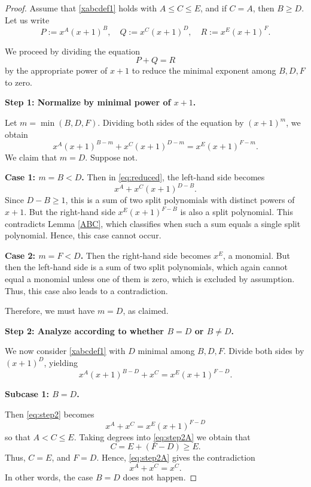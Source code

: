 \documentclass[12pt, reqno]{article}
\theoremstyle{plain}
\theoremstyle{definition}
\theoremstyle{remark}
\begin{document}
\begin{proof}
Assume that \eqref{xabcdef1} holds with \( A \leq C \leq E \), and if \( C = A \), then \( B \geq D \). Let us write
\[
P := x^A(x+1)^B, \quad Q := x^C(x+1)^D, \quad R := x^E(x+1)^F.
\]

We proceed by dividing the equation
\[
P + Q = R
\]
by the appropriate power of \( x+1 \) to reduce the minimal exponent among \( B, D, F \) to zero.

\textbf{Step 1: Normalize by minimal power of \( x+1 \).}

Let \( m = \min(B, D, F) \). Dividing both sides of the equation by \( (x+1)^m \), we obtain
\begin{equation}
\label{eq:reduced}
x^A(x+1)^{B - m} + x^C(x+1)^{D - m} = x^E(x+1)^{F - m}.
\end{equation}
We claim that \( m = D \). Suppose not.

\textbf{Case 1: \( m = B < D \).} Then in \eqref{eq:reduced}, the left-hand side becomes
\[
x^A + x^C(x+1)^{D - B}.
\]
Since \( D - B \geq 1 \), this is a sum of two split polynomials with distinct powers of \( x+1 \). But the right-hand side \( x^E(x+1)^{F - B} \) is also a split polynomial. This contradicts Lemma \ref{ABC}, which classifies when such a sum equals a single split polynomial. Hence, this case cannot occur.

\textbf{Case 2: \( m = F < D \).} Then the right-hand side becomes \( x^E \), a monomial. But then the left-hand side is a sum of two split polynomials, which again cannot equal a monomial unless one of them is zero, which is excluded by assumption. Thus, this case also leads to a contradiction.

Therefore, we must have \( m = D \), as claimed.

\textbf{Step 2: Analyze according to whether \( B = D \) or \( B \neq D \).}

We now consider \eqref{xabcdef1}
with \( D \) minimal among \( B, D, F \). Divide both sides by \( (x+1)^D \), yielding
\begin{equation}
\label{eq:step2}
x^A(x+1)^{B - D} + x^C = x^E(x+1)^{F - D}.
\end{equation}

\textbf{Subcase 1: \( B = D \).}

Then \eqref{eq:step2} becomes
\begin{equation}
\label{eq:step2A}
x^A + x^C = x^E(x+1)^{F - D}
\end{equation}
so that $A < C \leq E$. Taking degrees into  \eqref{eq:step2A} we obtain that
\[
C = E + (F - D) \geq E.
\]
Thus, $C=E$, and $F=D$. Hence, \eqref{eq:step2A} gives the contradiction 
\[
x^A+x^C = x^C.
\]
In other words, the case $B=D$ does not happen.



\end{proof}
\end{document}
